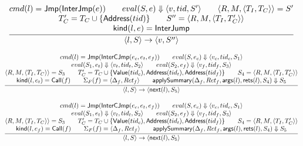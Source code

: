 \documentclass{article}
\newcommand{\step}[4]{\langle #1,#2\rangle \rightarrow \langle #3,#4\rangle}
\newcommand{\nexti}{\mathsf{next}}
\newcommand{\eval}[3]{eval(#1,#2) \Downarrow #3}
\begin{document}
\[
\frac{
    \begin{array}{@{}c@{}}
        cmd(l)=\mathsf{Jmp}(\mathsf{InterJmp}(e)) \qquad
        \eval{S}{e}{\langle v, tid, S'\rangle} \qquad
        \langle R,M,\langle T_I,T_C\rangle\rangle = S'\\
        T_C'=T_C \cup \{\mathsf{Address}(tid)\}\qquad
        S''=\langle R,M,\langle T_I,T_C'\rangle\rangle\\
        \mathsf{kind}(l,e)=\mathsf{InterJump}
    \end{array}
} { \step{l}{S}{v}{S''} }
\]

\[
\frac{
    \begin{array}{@{}c@{}}
        cmd(l)=\mathsf{Jmp}(\mathsf{InterCJmp}(e_c,e_t,e_f)) \qquad
        \eval{S}{e_c}{\langle v_c, tid_c,S_1\rangle} \\
        
        \eval{S_1}{e_t}{\langle v_t,tid_t,S_2\rangle} \qquad
        \eval{S_2}{e_f}{\langle v_f,tid_f,S_3\rangle} \\

        \langle R,M,\langle T_I,T_C\rangle\rangle = S_3\qquad
        T_C'=T_C \cup \{ \mathsf{Value}(tid_c), \mathsf{Address}(tid_t), \mathsf{Address}(tid_f) \}\qquad
        S_4=\langle R,M,\langle T_I,T_C'\rangle\rangle\\
        
        \mathsf{kind}(l,e_t)=\mathsf{Call}(f)\qquad
        \Sigma_F(f)=\langle \Delta_f,Ret_f\rangle \qquad
        \mathsf{applySummary}(\Delta_f,Ret_f,\mathsf{args}(l),\mathsf{rets}(l),S_4)\Downarrow S_5
    \end{array}
} { \step{l}{S}{\nexti(l)}{S_5} }
\]

\[
\frac{
    \begin{array}{@{}c@{}}
        cmd(l)=\mathsf{Jmp}(\mathsf{InterCJmp}(e_c,e_t,e_f)) \qquad
        \eval{S}{e_c}{\langle v_c, tid_c,S_1\rangle} \\
        
        \eval{S_1}{e_t}{\langle v_t,tid_t,S_2\rangle} \qquad
        \eval{S_2}{e_f}{\langle v_f,tid_f,S_3\rangle} \\

        \langle R,M,\langle T_I,T_C\rangle\rangle = S_3\qquad
        T_C'=T_C \cup \{ \mathsf{Value}(tid_c), \mathsf{Address}(tid_t), \mathsf{Address}(tid_f) \}\qquad
        S_4=\langle R,M,\langle T_I,T_C'\rangle\rangle\\
        
        \mathsf{kind}(l,e_f)=\mathsf{Call}(f)\qquad
        \Sigma_F(f)=\langle \Delta_f,Ret_f\rangle \qquad
        \mathsf{applySummary}(\Delta_f,Ret_f,\mathsf{args}(l),\mathsf{rets}(l),S_4)\Downarrow S_5
    \end{array}
} { \step{l}{S}{\nexti(l)}{S_5} }
\]
\end{document}
